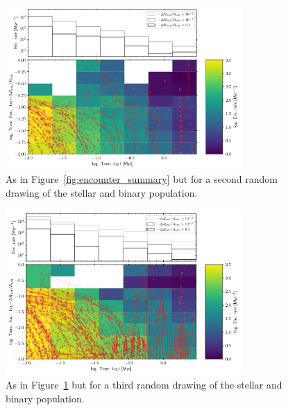 \documentclass{aa}
\begin{document}
\begin{figure}
    \centering
    \includegraphics[width=0.8\textwidth]{Figures/encounter_summary_mRrel_2.pdf}
    \caption{As in Figure~\ref{fig:encounter_summary} but for a second random drawing of the stellar and binary population. }
    \label{fig:encounter_summary_2}
\end{figure}


\begin{figure}
    \centering
    \includegraphics[width=0.8\textwidth]{Figures/encounter_summary_mRrel_3.pdf}
    \caption{As in Figure~\ref{fig:encounter_summary_2} but for a third random drawing of the stellar and binary population.}
    \label{fig:encounter_summary_3}
\end{figure}
\end{document}
